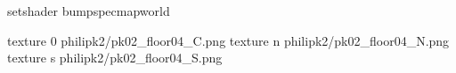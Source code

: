 setshader bumpspecmapworld

texture 0 philipk2/pk02_floor04_C.png
texture n philipk2/pk02_floor04_N.png
texture s philipk2/pk02_floor04_S.png
